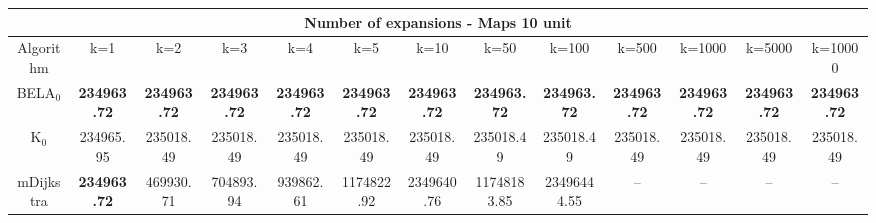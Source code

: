 \begin{tabular}{c|cccccccccccc}\toprule
\multicolumn{13}{c}{Number of expansions - Maps 10 unit}\\ \midrule
Algorithm & k=1 & k=2 & k=3 & k=4 & k=5 & k=10 & k=50 & k=100 & k=500 & k=1000 & k=5000 & k=10000 \\ \midrule
BELA$_0$ & \textbf{234963.72} & \textbf{234963.72} & \textbf{234963.72} & \textbf{234963.72} & \textbf{234963.72} & \textbf{234963.72} & \textbf{234963.72} & \textbf{234963.72} & \textbf{234963.72} & \textbf{234963.72} & \textbf{234963.72} & \textbf{234963.72} \\
K$_0$ & 234965.95 & 235018.49 & 235018.49 & 235018.49 & 235018.49 & 235018.49 & 235018.49 & 235018.49 & 235018.49 & 235018.49 & 235018.49 & 235018.49 \\
mDijkstra & \textbf{234963.72} & 469930.71 & 704893.94 & 939862.61 & 1174822.92 & 2349640.76 & 11748183.85 & 23496444.55 & -- & -- & -- & -- \\ \bottomrule 
\end{tabular}
